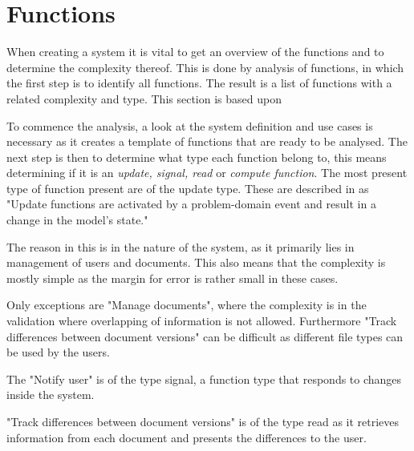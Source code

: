 \section{Functions}
When creating a system it is vital to get an overview of the functions and to determine the complexity thereof.
This is done by analysis of functions, in which the first step is to identify all functions.
The result is a list of functions with a related complexity and type.
This section is based upon\citep[ch.~7]{Rod-Aalborg}

To commence the analysis, a look at the system definition and use cases is necessary as it creates a template of functions that are ready to be analysed.
The next step is then to determine what type each function belong to, this means determining if it is an \textit{update, signal, read} or \textit{compute function}.
The most present type of function present are of the update type.
These are described in \citep[p.~140]{Rod-Aalborg}
as "Update functions are activated by a problem-domain event and result in a change in the model's state."\citep[p.~140]{Rod-Aalborg}

The reason in this is in the nature of the system, as it primarily lies in management of users and documents.
This also means that the complexity is mostly simple as the margin for error is rather small in these cases.

Only exceptions are "Manage documents", where the complexity is in the validation where overlapping of information is not allowed.
Furthermore "Track differences between document versions" can be difficult as different file types can be used by the users.

The "Notify user" is of the type signal, a function type that responds to changes inside the system.

"Track differences between document versions" is of the type read as it retrieves information from each document and presents the differences to the user.

